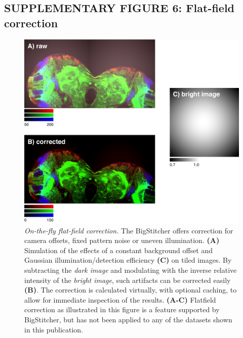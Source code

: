 \documentclass[]{spie}  %
\begin{document}
\subsection*{SUPPLEMENTARY FIGURE 6: Flat-field correction}
\vspace{1mm}
\begin{figure}[h!]
\includegraphics[width=\textwidth]{fig-flatfield.jpg}
\vspace{-2.0mm}
\caption{\hspace{-0.5mm} \emph{On-the-fly flat-field correction.} The BigStitcher offers correction for camera offsets, fixed pattern noise or uneven illumination. \textbf{(A)}  Simulation of the effects of a constant background offset and Gaussian illumination/detection efficiency \textbf{(C)} on tiled images. By subtracting the \emph{dark image} and modulating with the inverse relative intensity of the \emph{bright image}, such artifacts can be corrected easily \textbf{(B)}. The correction is calculated virtually, with optional caching, to allow for immediate inspection of the results. \textbf{(A-C)} Flatfield correction as illustrated in this figure is a feature supported by BigStitcher, but has not been applied to any of the datasets shown in this publication.
}
\label{fig:sup-fig-flatfield}
\end{figure}

\pagebreak
\end{document}
